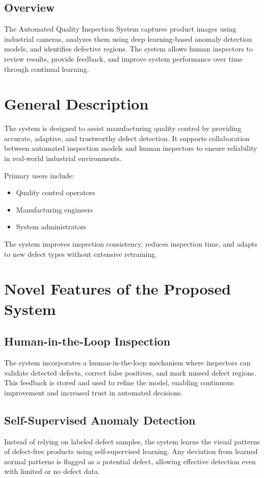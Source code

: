 \documentclass[12pt,a4paper]{article}
\begin{document}
\subsection{Overview}
The Automated Quality Inspection System captures product images using industrial cameras, analyzes them using deep learning-based anomaly detection models, and identifies defective regions. The system allows human inspectors to review results, provide feedback, and improve system performance over time through continual learning.

\section{General Description}

The system is designed to assist manufacturing quality control by providing accurate, adaptive, and trustworthy defect detection. It supports collaboration between automated inspection models and human inspectors to ensure reliability in real-world industrial environments.

Primary users include:
\begin{itemize}
    \item Quality control operators
    \item Manufacturing engineers
    \item System administrators
\end{itemize}

The system improves inspection consistency, reduces inspection time, and adapts to new defect types without extensive retraining.

\section{Novel Features of the Proposed System}

\subsection{Human-in-the-Loop Inspection}
The system incorporates a human-in-the-loop mechanism where inspectors can validate detected defects, correct false positives, and mark missed defect regions. This feedback is stored and used to refine the model, enabling continuous improvement and increased trust in automated decisions.

\subsection{Self-Supervised Anomaly Detection}
Instead of relying on labeled defect samples, the system learns the visual patterns of defect-free products using self-supervised learning. Any deviation from learned normal patterns is flagged as a potential defect, allowing effective detection even with limited or no defect data.
\end{document}

